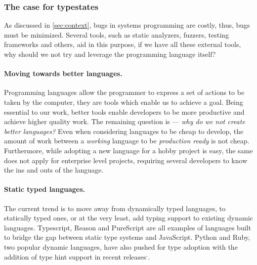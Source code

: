 \subsubsection*{The case for typestates}

As discussed in \autoref{sec:context}, bugs in systems programming are costly,
thus, bugs must be minimized.
Several tools, such as static analyzers, fuzzers, testing frameworks and others,
aid in this purpose, if we have all these external tools,
why should we not try and leverage the programming language itself?

\paragraph{Moving towards better languages.}
Programming languages allow the programmer to express a set of actions to be taken by the computer,
they are tools which enable us to achieve a goal.
Being essential to our work, better tools enable developers to be more productive and achieve higher quality work.
The remaining question is --- \emph{why do we not create better languages?}
Even when considering languages to be cheap to develop,
the amount of work between a \emph{working} language to be \emph{production ready} is not cheap.
Furthermore, while adopting a new language for a hobby project is easy,
the same does not apply for enterprise level projects,
requiring several developers to know the ins and outs of the language.

\paragraph{Static typed languages.}
The current trend is to move away from dynamically typed languages,
to statically typed ones, or at the very least, add typing support to existing dynamic languages.
Typescript,
Reason and
PureScript
are all examples of languages built to bridge the gap between static type systems and JavaScript.
Python and Ruby, two popular dynamic languages, have also pushed for type adoption
with the addition of type hint support in recent
releases$^,$.


